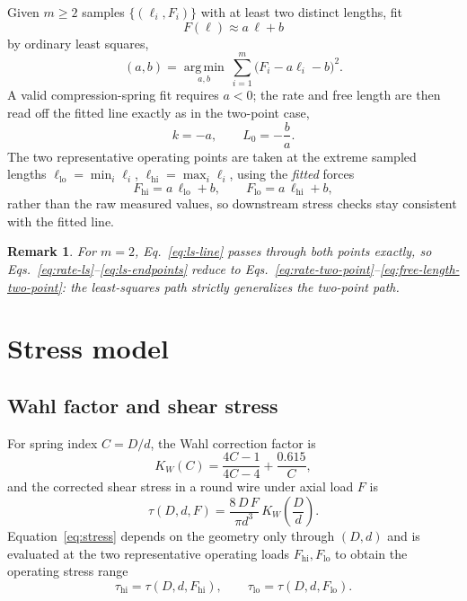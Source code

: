 \documentclass[11pt]{article}
\newtheorem{remark}{Remark}
\begin{document}
Given $m \ge 2$ samples $\{(\ell_i,F_i)\}$ with at least two distinct
lengths, fit
\begin{equation}
F(\ell) \approx a\,\ell + b
\label{eq:ls-line}
\end{equation}
by ordinary least squares,
\begin{equation}
(a,b) = \operatorname*{arg\,min}_{a,b}\ \sum_{i=1}^{m}\big(F_i - a\ell_i - b\big)^2 .
\end{equation}
A valid compression-spring fit requires $a<0$; the rate and free length
are then read off the fitted line exactly as in the two-point case,
\begin{equation}
k = -a, \qquad L_0 = -\frac{b}{a}.
\label{eq:rate-ls}
\end{equation}
The two representative operating points are taken at the extreme sampled
lengths $\ell_{\mathrm{lo}}=\min_i \ell_i$, $\ell_{\mathrm{hi}}=\max_i \ell_i$,
using the \emph{fitted} forces
\begin{equation}
F_{\mathrm{hi}} = a\,\ell_{\mathrm{lo}} + b, \qquad
F_{\mathrm{lo}} = a\,\ell_{\mathrm{hi}} + b,
\label{eq:ls-endpoints}
\end{equation}
rather than the raw measured values, so downstream stress checks stay
consistent with the fitted line.

\begin{remark}
For $m=2$, Eq.~\eqref{eq:ls-line} passes through both points exactly, so
Eqs.~\eqref{eq:rate-ls}--\eqref{eq:ls-endpoints} reduce to
Eqs.~\eqref{eq:rate-two-point}--\eqref{eq:free-length-two-point}: the
least-squares path strictly generalizes the two-point path.
\end{remark}

\section{Stress model}

\subsection{Wahl factor and shear stress}

For spring index $C = D/d$, the Wahl correction factor is
\begin{equation}
K_W(C) = \frac{4C-1}{4C-4} + \frac{0.615}{C},
\label{eq:wahl}
\end{equation}
and the corrected shear stress in a round wire under axial load $F$ is
\begin{equation}
\tau(D,d,F) = \frac{8\,D\,F}{\pi d^{3}}\,K_W\!\left(\frac{D}{d}\right).
\label{eq:stress}
\end{equation}
Equation~\eqref{eq:stress} depends on the geometry only through $(D,d)$
and is evaluated at the two representative operating loads
$F_{\mathrm{hi}}, F_{\mathrm{lo}}$ to obtain the operating stress range
\begin{equation}
\tau_{\mathrm{hi}} = \tau(D,d,F_{\mathrm{hi}}), \qquad
\tau_{\mathrm{lo}} = \tau(D,d,F_{\mathrm{lo}}).
\label{eq:stress-extremes}
\end{equation}
\end{document}
